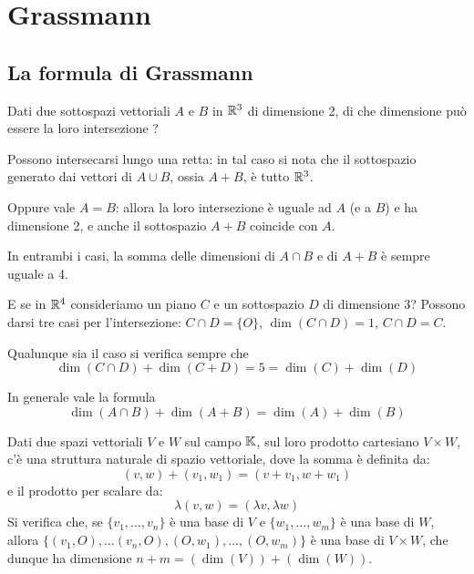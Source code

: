 \chapter{Grassmann}
\section{La formula di Grassmann}
Dati due sottospazi vettoriali $A$ e $B$ in $\mathbb{R}^3$ di dimensione 2,
di che dimensione può essere la loro intersezione ?

Possono intersecarsi lungo una retta: in tal caso si nota che il sottospazio
generato dai vettori di $A \cup B$, ossia $A + B$, è tutto $\mathbb{R}^3$.

Oppure vale $A = B$: allora la loro intersezione è uguale ad $A$ (e a $B$) e
ha dimensione 2, e anche il sottospazio $A + B$ coincide con $A$.

In entrambi i casi, la somma delle dimensioni di $A \cap B$ e di $A + B$ è
sempre uguale a 4.

E se in $\mathbb{R}^4$ consideriamo un piano $C$ e un sottospazio $D$ di
dimensione 3?
Possono darsi tre casi per l'intersezione: $C \cap D = \{O\}$,
$\dim(C \cap D) = 1$, $C \cap D = C$.

Qualunque sia il caso si verifica sempre che
\[
	\dim(C \cap D) + \dim(C + D) = 5 = \dim(C) + \dim(D)
\]

In generale vale la formula
\[
	\dim(A \cap B) + \dim(A + B) = \dim(A) + \dim(B)
\]

Dati due spazi vettoriali $V$ e $W$ sul campo $\mathbb{K}$, sul loro prodotto
cartesiano $V \times W$, c'è una struttura naturale di spazio vettoriale, dove
la somma è definita da:
\[
	(v, w) + (v_1, w_1) = (v + v_1, w + w_1)
\]
e il prodotto per scalare da:
\[
	\lambda(v, w) = (\lambda v, \lambda w)
\]
Si verifica che, se $\{v_1, \dots, v_n\}$ è una base di $V$
e $\{w_1, \dots, w_m\}$ è una base di $W$, allora
$\{(v_1, O), \dots (v_n, O), (O, w_1), \dots, (O, w_m)\}$ è una base di
$V \times W$, che dunque ha dimensione $n + m = (\dim(V)) + (\dim(W))$.

